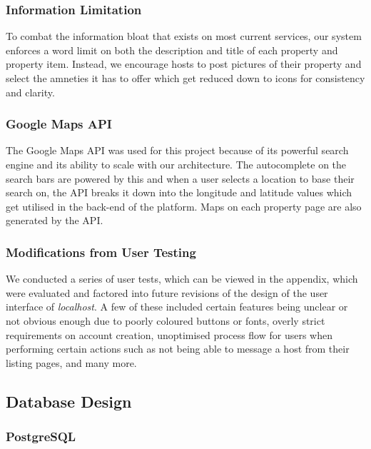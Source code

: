 \subsubsection{Information Limitation}
To combat the information bloat that exists on most current services, our system
enforces a word limit on both the description and title of each property and
property item. Instead, we encourage hosts to post pictures of their property and
select the amneties it has to offer which get reduced down to icons for 
consistency and clarity.

\subsubsection{Google Maps API}
The Google Maps API was used for this project because of its powerful search
engine and its ability to scale with our architecture. The autocomplete on the
search bars are powered by this and when a user selects a location to base their
search on, the API breaks it down into the longitude and latitude values which
get utilised in the back-end of the platform. Maps on each property page are also
generated by the API.

\subsubsection{Modifications from User Testing}
We conducted a series of user tests, which can be viewed in the appendix, which
were evaluated and factored into future revisions of the design of the user 
interface of \emph{localhost}. A few of these included certain features being
unclear or not obvious enough due to poorly coloured buttons or fonts, overly
strict requirements on account creation, unoptimised process flow for users when
performing certain actions such as not being able to message a host from their
listing pages, and many more. 

\subsection{Database Design}
\subsubsection{PostgreSQL}

